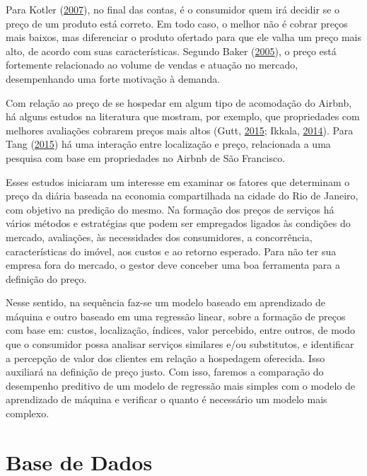 \documentclass[
	12pt,				%
	a4paper,		%
	oneside,    %
	chapter=TITLE,		   %
	section=TITLE,		   %
	subsection=TITLE,	   %
	subsubsection=TITLE, %
	english,			%
	french,				%
	spanish,			%
	brazil,				%
]{abntex2}
\begin{document}
Para Kotler (\protect\hyperlink{ref-kotler2007principios}{2007}), no
final das contas, é o consumidor quem irá decidir se o preço de um
produto está correto. Em todo caso, o melhor não é cobrar preços mais
baixos, mas diferenciar o produto ofertado para que ele valha um preço
mais alto, de acordo com suas características. Segundo Baker
(\protect\hyperlink{ref-baker2005administraccao}{2005}), o preço está
fortemente relacionado ao volume de vendas e atuação no mercado,
desempenhando uma forte motivação à demanda.

Com relação ao preço de se hospedar em algum tipo de acomodação do
Airbnb, há alguns estudos na literatura que mostram, por exemplo, que
propriedades com melhores avaliações cobrarem preços mais altos (Gutt,
\protect\hyperlink{ref-gutt2015sharing}{2015}; Ikkala,
\protect\hyperlink{ref-ikkala2014defining}{2014}). Para Tang
(\protect\hyperlink{ref-tang2015neighborhood}{2015}) há uma interação
entre localização e preço, relacionada a uma pesquisa com base em
propriedades no Airbnb de São Francisco.

Esses estudos iniciaram um interesse em examinar os fatores que
determinam o preço da diária baseada na economia compartilhada na cidade
do Rio de Janeiro, com objetivo na predição do mesmo. Na formação dos
preços de serviços há vários métodos e estratégias que podem ser
empregados ligados às condições do mercado, avaliações, às necessidades
dos consumidores, a concorrência, características do imóvel, aos custos
e ao retorno esperado. Para não ter sua empresa fora do mercado, o
gestor deve conceber uma boa ferramenta para a definição do preço.

Nesse sentido, na sequência faz-se um modelo baseado em aprendizado de
máquina e outro baseado em uma regressão linear, sobre a formação de
preços com base em: custos, localização, índices, valor percebido, entre
outros, de modo que o consumidor possa analisar serviços similares e/ou
substitutos, e identificar a percepção de valor dos clientes em relação
a hospedagem oferecida. Isso auxiliará na definição de preço justo. Com
isso, faremos a comparação do desempenho preditivo de um modelo de
regressão mais simples com o modelo de aprendizado de máquina e
verificar o quanto é necessário um modelo mais complexo.

\hypertarget{base-de-dados}{%
\chapter{Base de Dados}\label{base-de-dados}}
\end{document}
